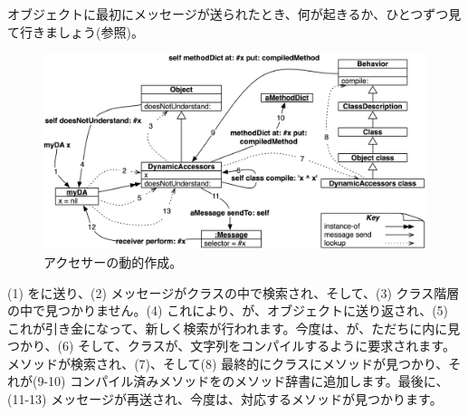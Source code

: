\documentclass[a4paper,10pt,twoside]{book}
\begin{document}
オブジェクトに最初にメッセージが送られたとき、何が起きるか、ひとつずつ見て行きましょう(参照)。

\begin{figure}[ht]\centering
	\includegraphics[width=\linewidth]{DynamicAccessors}
	\caption{アクセサーの動的作成。\figlabel{DynamicAccessors}}
\end{figure}

(1) をに送り、(2) メッセージがクラスの中で検索され、そして、(3) クラス階層の中で見つかりません。(4) これにより、が、オブジェクトに送り返され、(5) これが引き金になって、新しく検索が行われます。今度は、が、ただちに内に見つかり、(6) そして、クラスが、文字列をコンパイルするように要求されます。メソッドが検索され、(7)、そして(8) 最終的にクラスにメソッドが見つかり、それが(9-10) コンパイル済みメソッドをのメソッド辞書に追加します。最後に、(11-13) メッセージが再送され、今度は、対応するメソッドが見つかります。%
\end{document}

